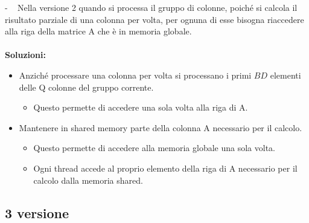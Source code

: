 \documentclass[compress]{beamer}
\begin{document}
\begin{frame}{\secname \text{ }- \subsecname\ }
    Nella versione 2 quando si processa il gruppo di colonne, poiché si calcola il risultato parziale di una colonna per volta, per ognuna di esse bisogna riaccedere alla riga della matrice A che è in memoria globale. \\ \\
    
    \textbf{Soluzioni:} \\
    \begin{itemize}
        \item Anziché processare una colonna per volta si processano i primi $BD$ elementi delle Q colonne del gruppo corrente.
        \begin{itemize}
            \item Questo permette di accedere una sola volta alla riga di A.
        \end{itemize}
        \item Mantenere in shared memory parte della colonna A necessario per il calcolo.
        \begin{itemize}
            \item Questo permette di accedere alla memoria globale una sola volta.
            \item Ogni thread accede al proprio elemento della riga di A necessario per il calcolo dalla memoria shared.
        \end{itemize}
    \end{itemize}
\end{frame}

\subsection{3 versione}
\end{document}
